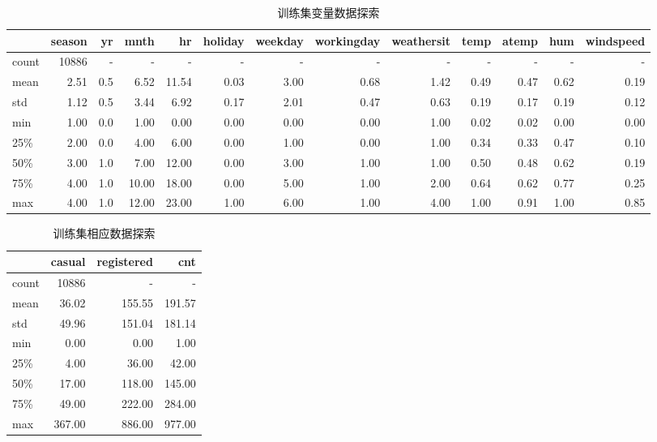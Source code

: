 \begin{table}[htbp]
    \centering\tiny
    \begin{tabular}{lrrrrrrrrrrrr}
    \toprule
    {}    & season & yr &  mnth & hr & holiday & weekday & workingday & weathersit & temp & atemp & hum & windspeed \\
    \midrule
    count & 10886 &  -  &   -   &    -  &   -  &   -  &   -  &   -  &   -  &   -  &   -  &   -  \\
    mean  &  2.51 & 0.5 &  6.52 & 11.54 & 0.03 & 3.00 & 0.68 & 1.42 & 0.49 & 0.47 & 0.62 & 0.19 \\
    std   &  1.12 & 0.5 &  3.44 &  6.92 & 0.17 & 2.01 & 0.47 & 0.63 & 0.19 & 0.17 & 0.19 & 0.12 \\
    min   &  1.00 & 0.0 &  1.00 &  0.00 & 0.00 & 0.00 & 0.00 & 1.00 & 0.02 & 0.02 & 0.00 & 0.00 \\
    25\%  &  2.00 & 0.0 &  4.00 &  6.00 & 0.00 & 1.00 & 0.00 & 1.00 & 0.34 & 0.33 & 0.47 & 0.10 \\
    50\%  &  3.00 & 1.0 &  7.00 & 12.00 & 0.00 & 3.00 & 1.00 & 1.00 & 0.50 & 0.48 & 0.62 & 0.19 \\
    75\%  &  4.00 & 1.0 & 10.00 & 18.00 & 0.00 & 5.00 & 1.00 & 2.00 & 0.64 & 0.62 & 0.77 & 0.25 \\
    max   &  4.00 & 1.0 & 12.00 & 23.00 & 1.00 & 6.00 & 1.00 & 4.00 & 1.00 & 0.91 & 1.00 & 0.85 \\
    \bottomrule
    \end{tabular}
    \cprotect\caption{训练集变量数据探索}\label{T:train-hour_x-data}
\end{table}

\begin{table}[htbp]
    \centering\tiny
    \begin{tabular}{lrrr}
    \toprule
    {}    & casual & registered & cnt \\
    \midrule
    count &  10886 &    -   &    -    \\
    mean  &  36.02 & 155.55 & 191.57  \\
    std   &  49.96 & 151.04 & 181.14  \\
    min   &   0.00 &   0.00 &   1.00  \\
    25\%  &   4.00 &  36.00 &  42.00  \\
    50\%  &  17.00 & 118.00 & 145.00  \\
    75\%  &  49.00 & 222.00 & 284.00  \\
    max   & 367.00 & 886.00 & 977.00  \\
    \bottomrule
    \end{tabular}
    \cprotect\caption{训练集相应数据探索}\label{T:train-hour_y-data}
\end{table}

